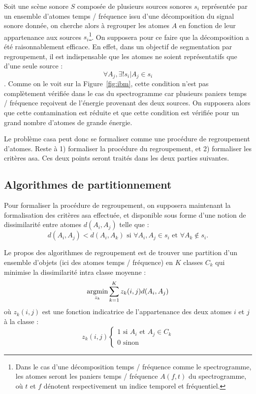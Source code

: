 Soit une scène sonore $S$ composée de plusieurs sources sonores $s_i$ représentée par un ensemble d'atomes temps / fréquence issu d'une décomposition du signal sonore donnée, on cherche alors à regrouper les atomes $A$ en fonction de leur appartenance aux sources $s_i$\footnote{Dans le cas d'une décomposition temps / fréquence comme le spectrogramme, les atomes seront les paniers temps / fréquence  $A(f, t)$ du spectrogramme, où $t$ et $f$ dénotent respectivement un indice temporel et fréquentiel.}. On supposera pour ce faire que la décomposition a été raisonnablement efficace. En effet, dans un objectif de segmentation par regroupement, il est indispensable que les atomes ne soient représentatifs que d'une seule source : $$\forall A_j, \exists ! s_i | A_j \in s_i$$. Comme on le voit sur la Figure~\ref{fig:ibm}, cette condition n'est pas complètement vérifiée dans le cas du spectrogramme car plusieurs paniers temps / fréquence reçoivent de l'énergie provenant des deux sources. On supposera alors que cette contamination est réduite et que cette condition est vérifiée pour un grand nombre d'atomes de grande énergie.

Le problème casa peut donc se formaliser comme une procédure de regroupement d'atomes. Reste à 1) formaliser la procédure du regroupement, et 2) formaliser les critères asa. Ces deux points seront traités dans les deux parties suivantes.

\subsection{Algorithmes de partitionnement}

Pour formaliser la procédure de regroupement, on supposera maintenant la formalisation des critères asa effectuée, et disponible sous forme d'une notion de dissimilarité entre atomes $d(A_i, A_j)$ telle que : $$d(A_i, A_j) < d(A_i, A_k) \text{ si } \forall A_i, A_j \in s_i \text{ et } \forall A_k \notin s_i.$$


Le propos des algorithmes de regroupement est de trouver une partition d'un ensemble d'objets (ici des atomes temps / fréquence) en $K$ classes $C_k$ qui minimise la dissimilarité intra classe moyenne :
\begin{equation}
  \operatorname*{argmin}_{z_k} \sum_{k=1}^{K} z_k(i, j) d(A_i, A_j)
\end{equation}
où $z_k(i, j)$ est une fonction indicatrice de l'appartenance des deux atomes $i$ et $j$ à la classe :
\begin{equation}
  z_k(i, j)
  \begin{cases}
    1 \text{ si } A_i \text{ et } A_j \in C_k \\
    0 \text{ sinon}
  \end{cases}
\end{equation}

